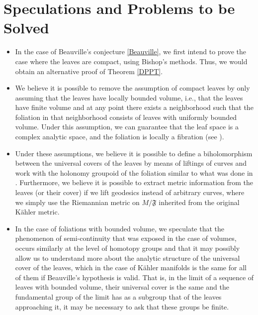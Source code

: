 \documentclass{article}
\begin{document}
\section{Speculations and Problems to be Solved}
\begin{itemize}
        \item In the case of Beauville's conjecture \ref{Beauville}, we first intend to prove the case where
        the leaves are compact, using Bishop's methods. Thus, we would obtain an alternative proof of
        Theorem \ref{DPPT}.

        \item We believe it is possible to remove the assumption of compact leaves by only assuming that the
        leaves have locally bounded volume, i.e., that the leaves have finite volume and at any point there exists
        a neighborhood such that the foliation in that neighborhood consists of leaves with uniformly bounded volume. Under this
        assumption, we can guarantee that the leaf space is a complex analytic space, and the foliation is
        locally a fibration (see \cite{A-V}).

        \item Under these assumptions, we believe it is possible to define a biholomorphism between the universal covers
        of the leaves by means of liftings of curves and work with the holonomy groupoid of the foliation
        similar to what was done in \cite{DPPT}. Furthermore, we believe it is possible to extract metric information from the
        leaves (or their cover) if we lift geodesics instead of arbitrary curves, where we simply use the
        Riemannian metric on $M/\mathfrak{F}$ inherited from the original Kähler metric.

        \item In the case of foliations with bounded volume, we speculate that the phenomenon of semi-continuity that was exposed in the case
        of volumes, occurs similarly at the level of homotopy groups and that it may possibly allow us to understand more about the
        analytic structure of the universal cover of the leaves, which in the case of Kähler manifolds is the same for all of them
        if Beauville's hypothesis is valid. That is, in the limit of a sequence of leaves with bounded volume, their universal
        cover is the same and the fundamental group of the limit has as a subgroup that of the leaves approaching it,
        it may be necessary to ask that these groups be finite.


\end{itemize}
\end{document}
